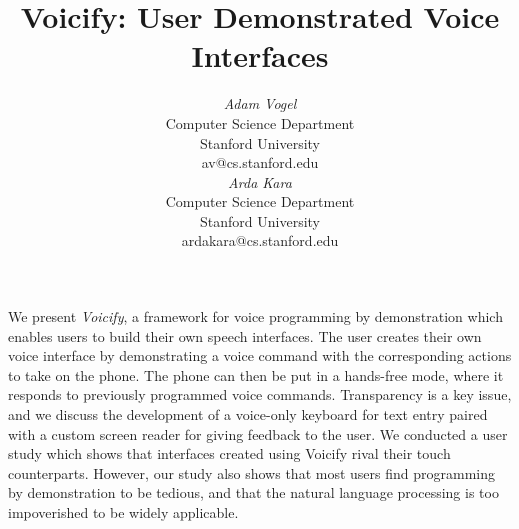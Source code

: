 \documentclass[letterpaper]{article}
\begin{document}




\title{Voicify: User Demonstrated Voice Interfaces}



\author{
\parbox[t]{9cm}{\centering
	     {\em Adam Vogel}\\
     Computer Science Department\\
             Stanford University \\
	     av@cs.stanford.edu}
\parbox[t]{9cm}{\centering
	     {\em Arda Kara}\\
	     Computer Science Department\\
       Stanford University\\
	     ardakara@cs.stanford.edu}
}

\maketitle

\abstract
We present \emph{Voicify}, a framework for voice programming by 
demonstration which enables users to build their own speech interfaces.
The user creates their own voice interface by demonstrating a voice command with the corresponding
actions to take on the phone. The phone can then be put in a hands-free mode, where it
responds to previously programmed voice commands. 
Transparency is a key issue, and we discuss the development of a voice-only keyboard for
text entry paired with a custom screen reader for giving feedback to the user.
We conducted a user study which shows that
interfaces created using Voicify rival their touch counterparts.
However, our study also shows that most users find programming by demonstration to be
tedious, and that the natural language processing is too impoverished to be widely applicable.
\end{document}

